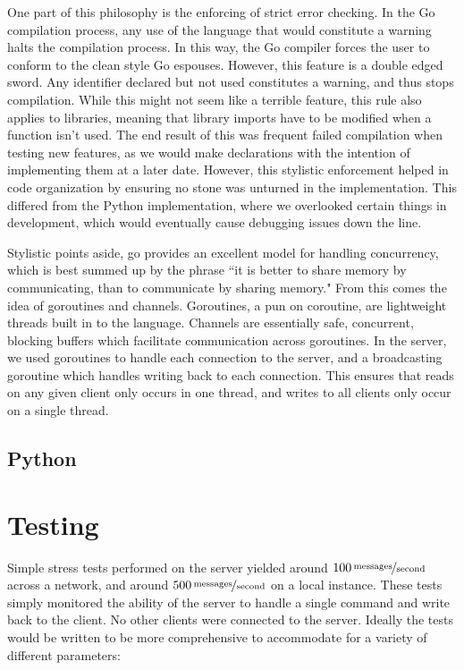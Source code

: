 \documentclass[12pt, letterpaper]{article}
\begin{document}
One part of this philosophy is the enforcing of strict error checking.
In the Go compilation process, any use of the language that would
constitute a warning halts the compilation process. In this way, the
Go compiler forces the user to conform to the clean style Go espouses.
However, this feature is a double edged sword. Any identifier declared
but not used constitutes a warning, and thus stops compilation. While
this might not seem like a terrible feature, this rule also applies to
libraries, meaning that library imports have to be modified when a
function isn't used. The end result of this was frequent failed
compilation when testing new features, as we would make declarations
with the intention of implementing them at a later date. However,
this stylistic enforcement helped in code organization by ensuring
no stone was unturned in the implementation. This differed from the
Python implementation, where we overlooked certain things in
development, which would eventually cause debugging issues down the
line. 

Stylistic points aside, go provides an excellent model for handling 
concurrency, which is best summed up by the phrase ``it is better to 
share memory by communicating, than to communicate by sharing memory." 
From this comes the idea of goroutines and channels. Goroutines, a pun 
on coroutine, are lightweight threads built in to the language. 
Channels are essentially safe, concurrent, blocking buffers which 
facilitate communication across goroutines. In the server, we used 
goroutines to handle each connection to the server, and a broadcasting
goroutine which handles writing back to each connection. This ensures
that reads on any given client only occurs in one thread, and writes to
all clients only occur on a single thread.


\subsection*{Python}



\section*{Testing}

Simple stress tests performed on the server yielded around
$\unitfrac[100]{messages}{second}$ 
across a network, and around
$\unitfrac[500]{messages}{second}$
on a 
local instance. These tests simply monitored the ability of the server 
to handle a single command and write back to the client. No other 
clients were connected to the server. Ideally the tests would be 
written to be more comprehensive to accommodate for a variety of 
different parameters:
\end{document}

